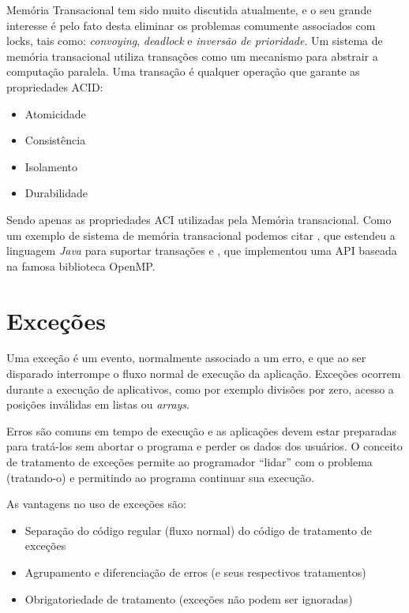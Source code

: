 Memória Transacional tem sido muito discutida atualmente, e o seu grande
interesse é pelo fato desta eliminar os problemas comumente associados com
locks, tais como:  \cite{TMASFKDS}{\it convoying}, \cite{TANE} {\it deadlock} e
\cite{intel} {\it inversão de
prioridade}. Um sistema de memória transacional utiliza \cite{bernstein} transações como
um mecanismo para abstrair a computação paralela. Uma transação é qualquer
operação que garante as propriedades ACID:

\begin{itemize}
    \item Atomicidade
    \item Consistência
    \item Isolamento
    \item Durabilidade
\end{itemize}

Sendo apenas as propriedades ACI utilizadas pela Memória transacional. Como
um exemplo de sistema de memória transacional podemos citar  \cite{LIGHTTRANS},
que estendeu a linguagem \textit{Java} para suportar transações e
\cite{TOTAPI}, que implementou uma API baseada na famosa biblioteca OpenMP.

\section{Exceções}
\label{sec:except}

Uma exceção é um evento, normalmente associado a um erro, e que ao ser disparado interrompe o 
fluxo normal de execução da aplicação. Exceções ocorrem durante a execução de aplicativos, como 
por exemplo divisões por zero, acesso a posições inválidas em listas ou
\textit{arrays}.

Erros são comuns em tempo de execução e as aplicações devem estar
preparadas para tratá-los sem abortar o programa e perder os dados dos
usuários. O conceito de tratamento de exceções permite ao programador
``lidar'' com o problema (tratando-o) e permitindo ao programa continuar
sua execução.

As vantagens no uso de exceções são: 

\begin{itemize}
\item Separação do código regular (fluxo normal) do código de tratamento de exceções
\item Agrupamento e diferenciação de erros (e seus respectivos tratamentos)
\item Obrigatoriedade de tratamento (exceções não podem ser ignoradas)
\end{itemize}


%
